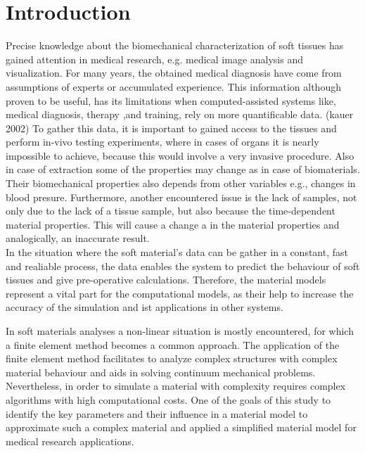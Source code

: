 
\chapter{Introduction} %

\label{Chapter2} %

Precise knowledge about the biomechanical characterization of soft tissues has gained 
attention in medical research, e.g. medical image analysis and visualization.
For many years, the obtained medical diagnosis have come from assumptions of experts or 
accumulated experience. This information although proven to be useful, has its limitations 
when computed-assisted systems like, medical diagnosis, therapy ,and training, rely on 
more quantificable data. (kauer 2002) To gather this data, it is important to gained access
to the tissues and perform in-vivo testing experiments, where in cases of organs it is nearly impossible to achieve, because this 
would involve a very invasive procedure. Also in case of extraction some of the properties
may change as in case of biomaterials. Their biomechanical properties also depends from other 
variables e.g., changes in blood presure. Furthermore, another encountered issue is the lack of samples, 
not only due to the lack of a tissue sample, but also because the time-dependent material 
properties. This will cause a change a in the material properties and analogically, an 
inaccurate result.\\

In the situation where the soft material's data can be gather in a constant, fast and realiable
process, the data enables the system to predict the behaviour of soft tissues and give pre-operative
 calculations. Therefore, the material models represent a vital part for the computational 
 models, as their help to increase the accuracy of the simulation and ist applications in other
 systems. 

In soft materials analyses a non-linear situation is mostly encountered, for which a finite 
element method becomes a common approach. The application of the finite element method
 facilitates to analyze complex structures with complex material behaviour and aids in 
 solving continuum mechanical problems. Nevertheless, in order to simulate a material with 
 complexity requires complex algorithms with high computational costs. One of the goals of 
 this study to identify the key parameters and their influence in a material model to 
 approximate such a complex material and applied a simplified material model for medical 
 research applications.\\
 
